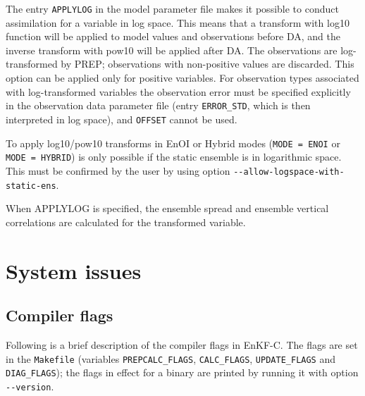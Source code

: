 \documentclass[11pt]{report}
\begin{document}
The entry \verb|APPLYLOG| in the model parameter file makes it possible to conduct assimilation for a variable in log space.
This means that a transform with log10 function will be applied to model values and observations before DA, and the inverse transform with pow10 will be applied after DA.
The observations are log-transformed by PREP; observations with non-positive values are discarded.
This option can be applied only for positive variables.
For observation types associated with log-transformed variables the observation error must be specified explicitly in the observation data parameter file (entry \verb|ERROR_STD|, which is then interpreted in log space), and \verb|OFFSET| cannot be used.

To apply log10/pow10 transforms in EnOI or Hybrid modes (\verb|MODE = ENOI| or \verb|MODE = HYBRID|) is only possible if the static ensemble is in logarithmic space.
This must be confirmed by the user by using option \verb|--allow-logspace-with-static-ens|.

When APPLYLOG is specified, the ensemble spread and ensemble vertical correlations are calculated for the transformed variable.

\section{System issues}

\subsection{Compiler flags}
\label{sec:flags}

Following is a brief description of the compiler flags in EnKF-C.
The flags are set in the \verb|Makefile| (variables \verb|PREPCALC_FLAGS|, \verb|CALC_FLAGS|, \verb|UPDATE_FLAGS| and \verb|DIAG_FLAGS|); the flags in effect for a binary are printed by running it with option \verb|--version|.
\end{document}
